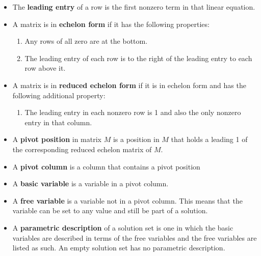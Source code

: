 \documentclass{article}
\begin{document}
\begin{itemize}

\item
The \textbf{leading entry} of a row is the first nonzero term in that linear
equation.

\item
A matrix is in \textbf{echelon form} if it has the following properties:

\begin{enumerate}

\item
Any rows of all zero are at the bottom.

\item
The leading entry of each row is to the right of the leading entry to each row
above it.

\end{enumerate}

\item
A matrix is in \textbf{reduced echelon form} if it is in echelon form and has
the following additional property:

\begin{enumerate}

\item
The leading entry in each nonzero row is 1 and also the only nonzero
entry in that column.

\end{enumerate}

\item
A \textbf{pivot position} in matrix $ M $ is a position in $ M $ that holds a
leading 1 of the corresponding reduced echelon matrix of $ M $.

\item
A \textbf{pivot column} is a column that contains a pivot position

\item
A \textbf{basic variable} is a variable in a pivot column.

\item
A \textbf{free variable} is a variable not in a pivot column. This means that
the variable can be set to any value and still be part of a solution.

\item
A \textbf{parametric description} of a solution set is one in which the basic
variables are described in terms of the free variables and the free variables
are listed as such. An empty solution set has no parametric description.

\end{itemize}
\end{document}
